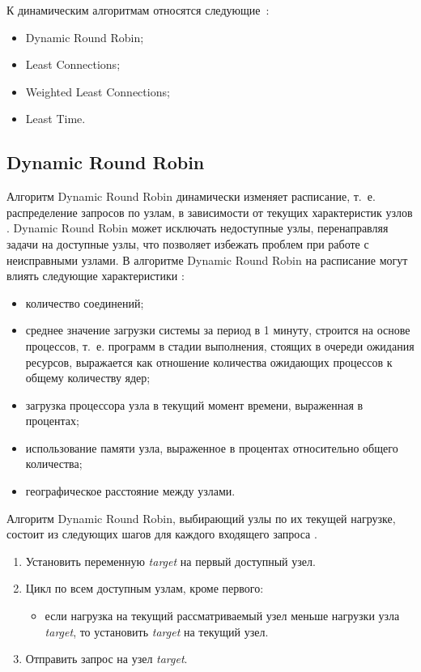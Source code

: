 К динамическим алгоритмам относятся следующие~\cite{drr, dll_warsh, mainsource}:
\begin{itemize}
	\item Dynamic Round Robin;
	\item Least Connections;
	\item Weighted Least Connections;
	\item Least Time.
\end{itemize}


\subsection{Dynamic Round Robin}

Алгоритм Dynamic Round Robin динамически изменяет расписание, т.~е. распределение запросов по узлам, в зависимости от текущих характеристик узлов \cite{drr}. Dynamic Round Robin может исключать недоступные узлы, перенаправляя задачи на доступные узлы, что позволяет избежать проблем при работе с неисправными узлами. 
В алгоритме Dynamic Round Robin на расписание могут влиять следующие характеристики \cite{dll_warsh, com_analysis, part_algos}: 
\begin{itemize}
	\item количество соединений;
	\item среднее значение загрузки системы за период в 1 минуту, строится на основе процессов, т.~е. программ в стадии выполнения, стоящих в очереди ожидания ресурсов, выражается как отношение количества ожидающих процессов к общему количеству ядер;
	\item загрузка процессора узла в текущий момент времени, выраженная в процентах;
	\item использование памяти узла, выраженное в процентах относительно общего количества;
	\item географическое расстояние между узлами.
\end{itemize}
Алгоритм Dynamic Round Robin, выбирающий узлы по их текущей нагрузке, состоит из следующих шагов для каждого входящего запроса  \cite{com_analysis}.
\begin{enumerate}
	\item Установить переменную \textit{target} на первый доступный узел.
	\item Цикл по всем доступным узлам, кроме первого:
	 \begin{itemize}
	 	\item если нагрузка на текущий рассматриваемый узел меньше нагрузки узла \textit{target}, то установить \textit{target} на текущий узел.
	 \end{itemize}
	\item Отправить запрос на узел \textit{target}.
\end{enumerate}

